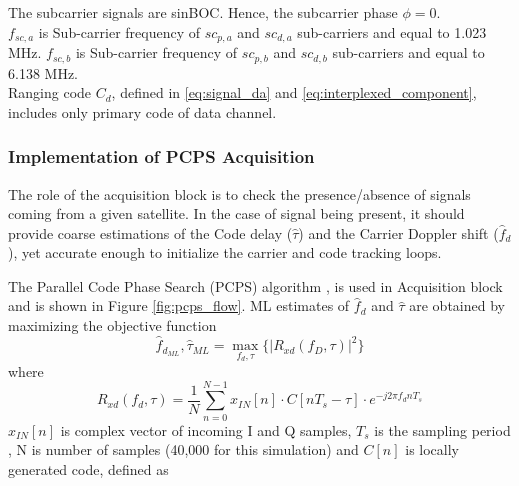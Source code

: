 \documentclass[conference]{IEEEtran}
\begin{document}
\noindent The subcarrier signals are sinBOC. Hence, the subcarrier phase $\phi=0$. \\

\noindent $f_{sc,a}$ is Sub-carrier frequency of $sc_{p,a}$ and $sc_{d,a}$ sub-carriers and equal to 1.023 MHz. 
$f_{sc,b}$ is Sub-carrier frequency of $sc_{p,b}$ and $sc_{d,b}$ sub-carriers and equal to 6.138 MHz. \\

\noindent Ranging code $C_d$, defined in \eqref{eq:signal_da} and \eqref{eq:interplexed_component}, includes only primary code of data channel. \\








\subsubsection{Implementation of PCPS Acquisition}

The role of the acquisition block is to check the presence/absence of signals coming from a 
given satellite. In the case of signal being present, it should provide coarse estimations of the 
Code delay ($\hat{\tau}$) and the Carrier Doppler shift ($\hat{f}_d$), yet accurate enough to initialize the carrier and code 
tracking loops.

The Parallel Code Phase Search (PCPS) algorithm \cite{b1},\cite{b3} is used in Acquisition block 
and is shown in Figure \ref{fig:pcps_flow}. ML estimates of $\hat{f}_d$ and $\hat{\tau}$ are obtained by maximizing the objective function
\begin{equation}
	\hat{f}_{d_{ML}}, \hat{\tau}_{ML} = \max_{f_d,\tau} \{ |R_{xd}(f_D,\tau) | ^2\}
	\label{eq:pcps}
\end{equation}
\noindent where
\begin{equation}
	R_{xd}(f_d,\tau) = \frac{1}{N} \sum_{n=0}^{N-1} x_{IN}[n] \cdot C[nT_s-\tau] \cdot e^{-j2\pi f_dnT_s}
	\label{eq:pcps2}
\end{equation}
\noindent $x_{IN}[n]$ is complex vector of incoming I and Q samples, $T_s$ is the sampling period 
, N is number of samples (40,000 for this simulation) and $C[n]$ is locally generated code, defined as
\end{document}

